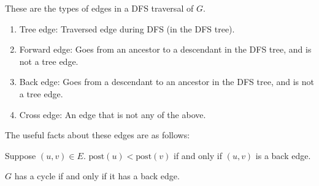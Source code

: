 \begin{definition} 
    These are the types of edges in a DFS traversal of $G$.
    \begin{enumerate}
        \item Tree edge: Traversed edge during DFS (in the DFS tree).
        \item Forward edge: Goes from an ancestor to a descendant in the DFS tree, and is not a tree edge.
        \item Back edge: Goes from a descendant to an ancestor in the DFS tree, and is not a tree edge.
        \item Cross edge: An edge that is not any of the above.
    \end{enumerate}
\end{definition}

The useful facts about these edges are as follows:

\begin{note}
    Suppose $(u, v) \in E$. $\text{post}(u) < \text{post}(v)$ if and only if $(u, v)$ is a back edge.
\end{note}

\begin{note}
    $G$ has a cycle if and only if it has a back edge.
\end{note}